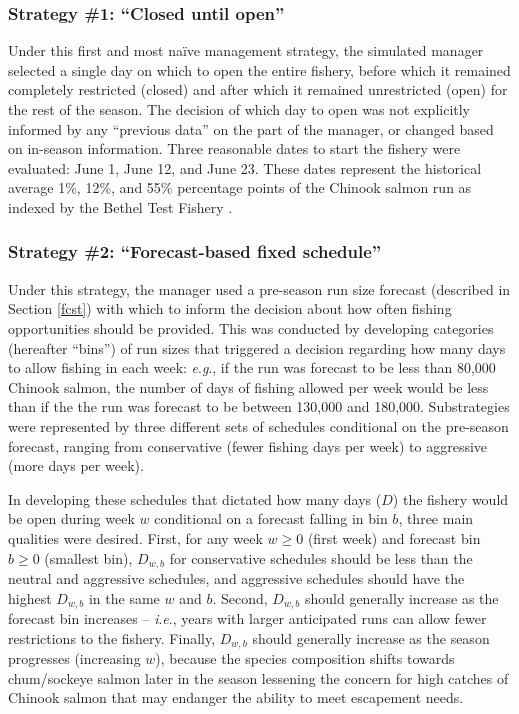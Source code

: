 \documentclass[12pt,]{book}
\theoremstyle{definition}
\theoremstyle{definition}
\theoremstyle{definition}
\theoremstyle{remark}
\begin{document}
\subsubsection{\texorpdfstring{Strategy \#1: ``Closed until
open''}{Strategy \#1: Closed until open}}\label{strategy-1-closed-until-open}

\noindent
Under this first and most naïve management strategy, the simulated
manager selected a single day on which to open the entire fishery,
before which it remained completely restricted (closed) and after which
it remained unrestricted (open) for the rest of the season. The decision
of which day to open was not explicitly informed by any ``previous
data'' on the part of the manager, or changed based on in-season
information. Three reasonable dates to start the fishery were evaluated:
June 1, June 12, and June 23. These dates represent the historical
average 1\%, 12\%, and 55\% percentage points of the Chinook salmon run
as indexed by the Bethel Test Fishery \citep{bue-lipka-2016}.

\subsubsection{\texorpdfstring{Strategy \#2: ``Forecast-based fixed
schedule''}{Strategy \#2: Forecast-based fixed schedule}}\label{strategy-2-forecast-based-fixed-schedule}

\noindent
Under this strategy, the manager used a pre-season run size forecast
(described in Section \ref{fcst}) with which to inform the decision
about how often fishing opportunities should be provided. This was
conducted by developing categories (hereafter ``bins'') of run sizes
that triggered a decision regarding how many days to allow fishing in
each week: \emph{e}.\emph{g}., if the run was forecast to be less than
80,000 Chinook salmon, the number of days of fishing allowed per week
would be less than if the the run was forecast to be between 130,000 and
180,000. Substrategies were represented by three different sets of
schedules conditional on the pre-season forecast, ranging from
conservative (fewer fishing days per week) to aggressive (more days per
week).

In developing these schedules that dictated how many days (\(D\)) the
fishery would be open during week \(w\) conditional on a forecast
falling in bin \(b\), three main qualities were desired. First, for any
week \(w \ge 0\) (first week) and forecast bin \(b \ge 0\) (smallest
bin), \(D_{w,b}\) for conservative schedules should be less than the
neutral and aggressive schedules, and aggressive schedules should have
the highest \(D_{w,b}\) in the same \(w\) and \(b\). Second, \(D_{w,b}\)
should generally increase as the forecast bin increases --
\emph{i}.\emph{e}., years with larger anticipated runs can allow fewer
restrictions to the fishery. Finally, \(D_{w,b}\) should generally
increase as the season progresses (increasing \(w\)), because the
species composition shifts towards chum/sockeye salmon later in the
season lessening the concern for high catches of Chinook salmon that may
endanger the ability to meet escapement needs.
\end{document}
